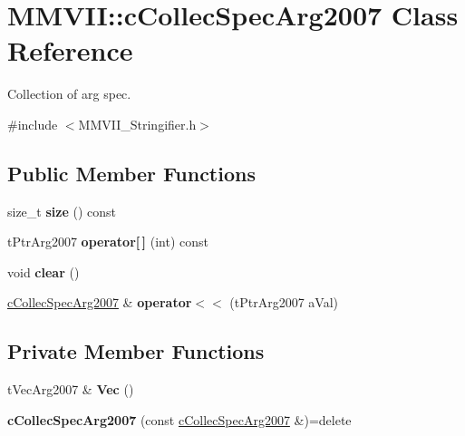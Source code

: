 \hypertarget{classMMVII_1_1cCollecSpecArg2007}{}\section{M\+M\+V\+II\+:\+:c\+Collec\+Spec\+Arg2007 Class Reference}
\label{classMMVII_1_1cCollecSpecArg2007}


Collection of arg spec.  




{\ttfamily \#include $<$M\+M\+V\+I\+I\+\_\+\+Stringifier.\+h$>$}

\subsection*{Public Member Functions}
\begin{DoxyCompactItemize}
\item 
size\+\_\+t {\bfseries size} () const \hypertarget{classMMVII_1_1cCollecSpecArg2007_ae986335a601eecf26cfdb3f00a10807d}{}\label{classMMVII_1_1cCollecSpecArg2007_ae986335a601eecf26cfdb3f00a10807d}

\item 
t\+Ptr\+Arg2007 {\bfseries operator\mbox{[}$\,$\mbox{]}} (int) const \hypertarget{classMMVII_1_1cCollecSpecArg2007_a2ef754710e98a2ed38f7ce24e10950b5}{}\label{classMMVII_1_1cCollecSpecArg2007_a2ef754710e98a2ed38f7ce24e10950b5}

\item 
void {\bfseries clear} ()\hypertarget{classMMVII_1_1cCollecSpecArg2007_a1506a96aad64719685f0e25f70bb9ad0}{}\label{classMMVII_1_1cCollecSpecArg2007_a1506a96aad64719685f0e25f70bb9ad0}

\item 
\hyperlink{classMMVII_1_1cCollecSpecArg2007}{c\+Collec\+Spec\+Arg2007} \& {\bfseries operator$<$$<$} (t\+Ptr\+Arg2007 a\+Val)\hypertarget{classMMVII_1_1cCollecSpecArg2007_a8380ced2bd280e89a6ede0799446e4f8}{}\label{classMMVII_1_1cCollecSpecArg2007_a8380ced2bd280e89a6ede0799446e4f8}

\end{DoxyCompactItemize}
\subsection*{Private Member Functions}
\begin{DoxyCompactItemize}
\item 
t\+Vec\+Arg2007 \& {\bfseries Vec} ()\hypertarget{classMMVII_1_1cCollecSpecArg2007_a917ab2a6ffa658239d480c9978fa7f1b}{}\label{classMMVII_1_1cCollecSpecArg2007_a917ab2a6ffa658239d480c9978fa7f1b}

\item 
{\bfseries c\+Collec\+Spec\+Arg2007} (const \hyperlink{classMMVII_1_1cCollecSpecArg2007}{c\+Collec\+Spec\+Arg2007} \&)=delete\hypertarget{classMMVII_1_1cCollecSpecArg2007_a57c9dcba6a6a354a62e70469104c20ef}{}\label{classMMVII_1_1cCollecSpecArg2007_a57c9dcba6a6a354a62e70469104c20ef}

\end{DoxyCompactItemize}

